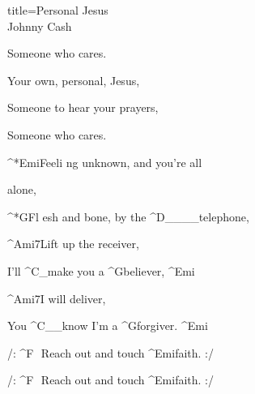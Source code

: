\begin{song}{title=\predtitle\centering Personal Jesus \\\large Johnny Cash  \vspace*{-0.3cm}}
\begin{centerjustified}
\begin{varwidth}[t]{0.48\textwidth}
	Someone who cares.

	Your own, personal, Jesus,

	Someone to hear your prayers,

	Someone who cares.


\sloka
	^*{Emi}Feeli ng unknown, and you're all 

	alone,

	^*{G}Fl esh and bone, by the ^{D{\color{white}\_\_\_\_}}telephone,

	^{Ami7}Lift up the receiver,

	I'll ^{C{\color{white}\_}}make you a ^{G}believer, ^{Emi}

	^{Ami7}I will deliver,
	
	You ^{C{\color{white}\_\_}}know I'm a ^{G}forgiver. ^{Emi}


	/: ^{F\sharp\,\,\,\,}Reach out and touch ^{Emi}faith. :/
	
	/: ^{F\sharp\,\,\,\,}Reach out and touch ^{Emi}faith. :/

\end{varwidth}

\end{centerjustified}
\setcounter{Slokočet}{0}
\end{song}	
